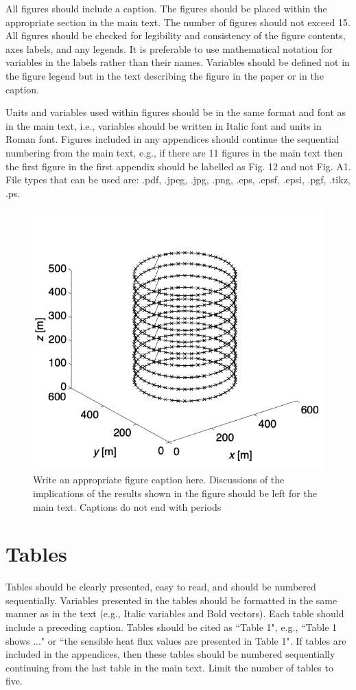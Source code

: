 All figures should include a caption. The figures should be placed within the appropriate section in the main text. The number of figures should not exceed 15. All figures should be checked for legibility and consistency of the figure contents, axes labels, and any legends. It is preferable to use mathematical notation for variables in the labels rather than their names. Variables should be defined not in the figure legend but in the text describing the figure in the paper or in the caption.

Units and variables used within figures should be in the same format and font as in the main text, i.e., variables should be written in Italic font and units in Roman font. Figures included in any appendices should continue the sequential numbering from the main text, e.g., if there are 11 figures in the main text then the first figure in the first appendix should be labelled as Fig. 12 and not Fig. A1. File types that can be used are: .pdf, .jpeg, .jpg, .png, .eps, .epsf, .epsi, .pgf, .tikz, .ps.

\begin{figure}
\centering
  \includegraphics{Fig1.png}
\caption{Write an appropriate figure caption here. Discussions of the implications of the results shown in the figure should be left for the main text. Captions do not end with periods}
\label{fig1}
\end{figure}


\section{Tables}
Tables should be clearly presented, easy to read, and should be numbered sequentially. Variables presented in the tables should be formatted in the same manner as in the text (e.g., Italic variables and Bold vectors). Each table should include a preceding caption. Tables should be cited as ``Table 1", e.g., ``Table 1 shows ..." or ``the sensible heat flux values are presented in Table 1". If tables are included in the appendices, then these tables should be numbered sequentially continuing from the last table in the main text. Limit the number of tables to five.


